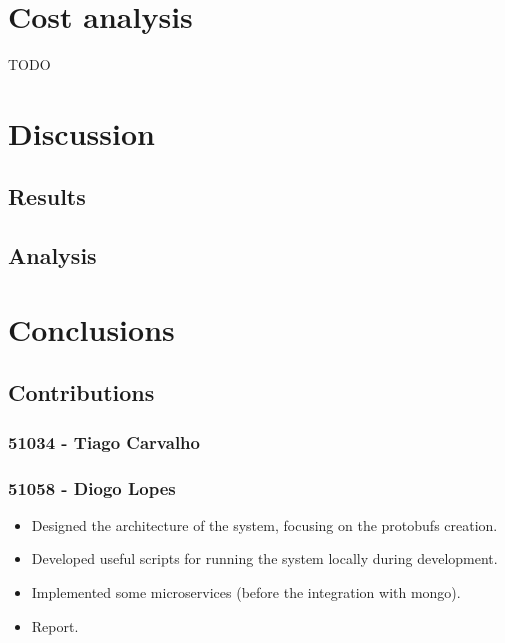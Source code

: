 \documentclass[oneside]{article}
\newcommand*\fpar{\hspace{1ex}}
\begin{document}
\section{Cost analysis}
\label{sec:cost}
\fpar TODO

\section{Discussion}
\label{sec:discussion}

  \subsection{Results}
  \label{sec:results}

  \subsection{Analysis}
  \label{sec:analysis}

\section{Conclusions}
\label{sec:conclusion}

  \subsection{Contributions}
  \label{sec:contributions}

    \subsubsection{51034 - Tiago Carvalho}
    \subsubsection{51058 - Diogo Lopes}
      \begin{itemize}
        \item Designed the architecture of the system, focusing on the protobufs creation.
        \item Developed useful scripts for running the system locally during development.
        \item Implemented some microservices (before the integration with mongo).
        \item Report.
      \end{itemize}
\end{document}

